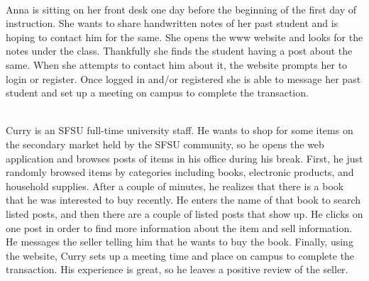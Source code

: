 \begin{description}[font=\bfseries\itshape]
\item[Use Case 3: Request Items (Anna)]\hfill\\
Anna is sitting on her front desk one day before the beginning of the first day of instruction. She wants to share handwritten notes of her past student and is hoping to contact him for the same. She opens the www website and looks for the notes under the class. Thankfully she finds the student having a post about the same.  When she attempts to contact him about it, the website prompts her to login or register. Once logged in and/or registered she is able to message her past student and set up a meeting on campus to complete the transaction.

\item[Use Case 4: Purchase through browsing (Curry)]\hfill\\
Curry is an SFSU full-time university staff. He wants to shop for some items on the secondary market held by the SFSU community, so he opens the web application and browses posts of items in his office during his break. First, he just randomly browsed items by categories including books, electronic products, and household supplies. After a couple of minutes, he realizes that there is a book that he was interested to buy recently. He enters the name of that book to search listed posts, and then there are a couple of listed posts that show up. He clicks on one post in order to find more information about the item and sell information. He messages the seller telling him that he wants to buy the book. Finally, using the website, Curry sets up a meeting time and place on campus to complete the transaction.  His experience is great, so he leaves a positive review of the seller.


\end{description}
